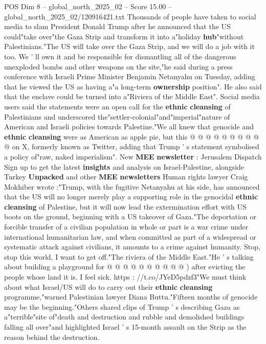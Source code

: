 \begin{textsample}{POS Dim 8 – global\_north\_2025\_02 – Score 15.00 – global\_north\_2025\_02/120916421.txt}  \label{ex:f8_pos_006}
Thousands of people have taken to social media to slam President Donald Trump after he announced that the US could"take over"the Gaza Strip and transform it into a"holiday \textbf{hub}"without Palestinians."The US will take over the Gaza Strip, and we will do a job with it too.
We ' ll own it and be responsible for dismantling all of the dangerous unexploded bombs and other weapons on the site,"he said during a press conference with Israeli Prime Minister Benjamin Netanyahu on Tuesday, adding that he viewed the US as having a"a long-term \textbf{ownership} position".
He also said that the enclave could be turned into a"Riviera of the Middle East".
Social media users said the statements were an open call for the \textbf{ethnic} \textbf{cleansing} of Palestinians and underscored the"settler-colonial"and"imperial"nature of American and Israeli policies towards Palestine."We all knew that genocide and \textbf{ethnic} \textbf{cleansing} were as American as apple pie, but this @ @ @ @ @ @ @ @ @ @ on X, formerly known as Twitter, adding that Trump ' s statement symbolised a policy of"raw, naked imperialism".
New \textbf{MEE} \textbf{newsletter} : Jerusalem Dispatch Sign up to get the latest \textbf{insights} and analysis on Israel-Palestine, alongside Turkey \textbf{Unpacked} and other \textbf{MEE} \textbf{newsletters} Human rights lawyer Craig Mokhiber wrote :"Trump, with the fugitive Netanyahu at his side, has announced that the US will no longer merely play a supporting role in the genocidal \textbf{ethnic} \textbf{cleansing} of Palestine, but it will now lead the extermination effort with US boots on the ground, beginning with a US takeover of Gaza."The deportation or forcible transfer of a civilian population in whole or part is a war crime under international humanitarian law, and when committed as part of a widespread or systematic attack against civilians, it amounts to a crime against humanity.
Stop, stop this world, I want to get off."The riviera of the Middle East."He ' s talking about building a playground for @ @ @ @ @ @ @ @ @ @ ) after evicting the people whose land it is.
I feel sick. https : //t.co/JYeD5pdzf3"We must think about what Israel/US will do to carry out their \textbf{ethnic} \textbf{cleansing} programme,"warned Palestinian lawyer Diana Buttu."Fifteen months of genocide may be the beginning."Others shared clips of Trump ' s describing Gaza as a"terrible"site of"death and destruction and rubble and demolished buildings falling all over"and highlighted Israel ' s 15-month assault on the Strip as the reason behind the destruction.

\end{textsample}
